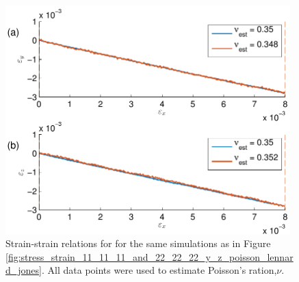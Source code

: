 \begin{figure}
\centering
\includegraphics[width=11cm]{../figures/thesis/strain_strain_11_11_11_and_22_22_22_y_z_poisson_lennard_jones.pdf}
\caption{Strain-strain relations for for the same simulations as in Figure \ref{fig:stress_strain_11_11_11_and_22_22_22_y_z_poisson_lennard_jones}. All data points were used to estimate Poisson's ration,$\nu$.}
\label{fig:strain_strain_11_11_11_and_22_22_22_y_z_poisson_lennard_jones}
\end{figure}

